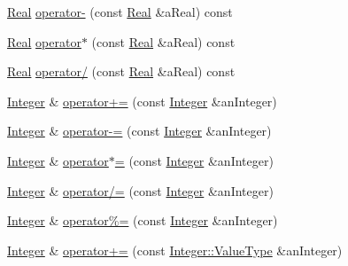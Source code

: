 \begin{DoxyCompactItemize}
\item 
\mbox{\hyperlink{classlibrary_1_1core_1_1types_1_1_real}{Real}} \mbox{\hyperlink{classlibrary_1_1core_1_1types_1_1_integer_acd14824d3ca5530cd8952f3e249e310f}{operator-\/}} (const \mbox{\hyperlink{classlibrary_1_1core_1_1types_1_1_real}{Real}} \&a\+Real) const
\item 
\mbox{\hyperlink{classlibrary_1_1core_1_1types_1_1_real}{Real}} \mbox{\hyperlink{classlibrary_1_1core_1_1types_1_1_integer_a3edc207fd4799cb16eb4075fdd098efb}{operator$\ast$}} (const \mbox{\hyperlink{classlibrary_1_1core_1_1types_1_1_real}{Real}} \&a\+Real) const
\item 
\mbox{\hyperlink{classlibrary_1_1core_1_1types_1_1_real}{Real}} \mbox{\hyperlink{classlibrary_1_1core_1_1types_1_1_integer_a6724d09c95b335402fe3553a13dd725d}{operator/}} (const \mbox{\hyperlink{classlibrary_1_1core_1_1types_1_1_real}{Real}} \&a\+Real) const
\item 
\mbox{\hyperlink{classlibrary_1_1core_1_1types_1_1_integer}{Integer}} \& \mbox{\hyperlink{classlibrary_1_1core_1_1types_1_1_integer_aeadb166badac8d39b41f9a5419dbc1cc}{operator+=}} (const \mbox{\hyperlink{classlibrary_1_1core_1_1types_1_1_integer}{Integer}} \&an\+Integer)
\item 
\mbox{\hyperlink{classlibrary_1_1core_1_1types_1_1_integer}{Integer}} \& \mbox{\hyperlink{classlibrary_1_1core_1_1types_1_1_integer_a006c1d480aa3cd21b2c48693fa3dccf7}{operator-\/=}} (const \mbox{\hyperlink{classlibrary_1_1core_1_1types_1_1_integer}{Integer}} \&an\+Integer)
\item 
\mbox{\hyperlink{classlibrary_1_1core_1_1types_1_1_integer}{Integer}} \& \mbox{\hyperlink{classlibrary_1_1core_1_1types_1_1_integer_a7de90525de769797c765bf6738b0c6c7}{operator$\ast$=}} (const \mbox{\hyperlink{classlibrary_1_1core_1_1types_1_1_integer}{Integer}} \&an\+Integer)
\item 
\mbox{\hyperlink{classlibrary_1_1core_1_1types_1_1_integer}{Integer}} \& \mbox{\hyperlink{classlibrary_1_1core_1_1types_1_1_integer_aaf72e97cae17baba1b2bd216898df8a8}{operator/=}} (const \mbox{\hyperlink{classlibrary_1_1core_1_1types_1_1_integer}{Integer}} \&an\+Integer)
\item 
\mbox{\hyperlink{classlibrary_1_1core_1_1types_1_1_integer}{Integer}} \& \mbox{\hyperlink{classlibrary_1_1core_1_1types_1_1_integer_ac02bfe57c83772f179253b1edd0eb4f5}{operator\%=}} (const \mbox{\hyperlink{classlibrary_1_1core_1_1types_1_1_integer}{Integer}} \&an\+Integer)
\item 
\mbox{\hyperlink{classlibrary_1_1core_1_1types_1_1_integer}{Integer}} \& \mbox{\hyperlink{classlibrary_1_1core_1_1types_1_1_integer_a499066287116e506a750e7a55d390a6d}{operator+=}} (const \mbox{\hyperlink{classlibrary_1_1core_1_1types_1_1_integer_a623afb1580f870fd8a1997b1c12c917d}{Integer\+::\+Value\+Type}} \&an\+Integer)

\end{DoxyCompactItemize}

